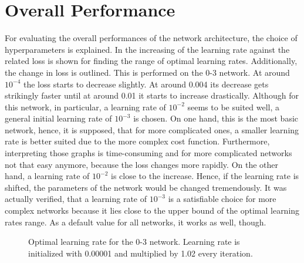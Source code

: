 \section{Overall Performance}
\label{sec:results-overall}
For evaluating the overall performances of the network architecture, the choice of hyperparameters is explained.
In  the increasing of the learning rate against the related loss is shown for finding the range of optimal learning rates.
Additionally, the change in loss is outlined.
This is performed on the 0-3 network.
At around $10^{-4}$ the loss starts to decrease slightly.
At around 0.004 its decrease gets strikingly faster until at around 0.01 it starts to increase drastically.
Although for this network, in particular, a learning rate of $10^{-2}$ seems to be suited well, a general initial learning rate of $10^{-3}$ is chosen.
On one hand, this is the most basic network, hence, it is supposed, that for more complicated ones, a smaller learning rate is better suited due to the more complex cost function.
Furthermore, interpreting those graphs is time-consuming and for more complicated networks not that easy anymore, because the loss changes more rapidly.
On the other hand, a learning rate of $10^{-2}$ is close to the increase.
Hence, if the learning rate is shifted, the parameters of the network would be changed tremendously.
It was actually verified, that a learning rate of $10^{-3}$ is a satisfiable choice for more complex networks because it lies close to the upper bound of the optimal learning rates range.
As a default value for all networks, it works as well, though.
\begin{figure}
	\setlength{}
	\setlength{}
	\centering
	\begin{subfigure}{.5\textwidth}
		\centering
		
	\end{subfigure}%
	\begin{subfigure}{.5\textwidth}
		\centering
		
	\end{subfigure}
	\caption[Optimal learning rate for the 0-3 network]{Optimal learning rate for the 0-3 network. Learning rate is initialized with 0.00001 and multiplied by 1.02 every iteration.}
	\label{fig:optimal-learning-rate}
\end{figure}

